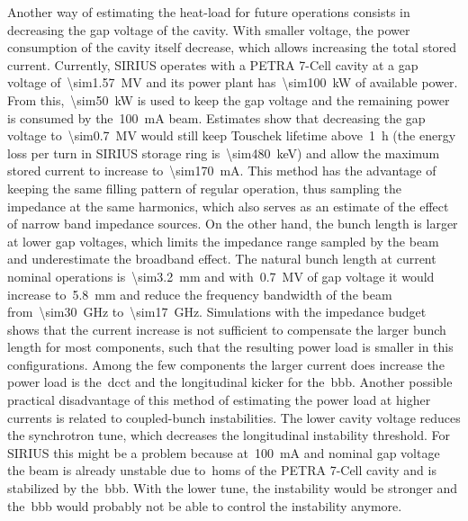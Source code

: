 \documentclass[a4paper,
               biblatex,     %
               ]{jacow}
\begin{document}
    Another way of estimating the heat-load for future operations consists in decreasing the gap voltage of the cavity. With smaller voltage, the power consumption of the cavity itself decrease, which allows increasing the total stored current. Currently, SIRIUS operates with a PETRA 7-Cell cavity at a gap voltage of~\SI{\sim1.57}{\mega\volt} and its power plant has~\SI{\sim100}{\kilo\watt} of available power. From this,~\SI{\sim50}{\kilo\watt} is used to keep the gap voltage and the remaining power is consumed by the~\SI{100}{\milli\ampere} beam. Estimates show that decreasing the gap voltage to~\SI{\sim0.7}{\mega\volt} would still keep Touschek lifetime above~\SI{1}{\hour} (the energy loss per turn in SIRIUS storage ring is~\SI{\sim480}{\kilo\electronvolt}) and allow the maximum stored current to increase to~\SI{\sim170}{\milli\ampere}. This method has the advantage of keeping the same filling pattern of regular operation, thus sampling the impedance at the same harmonics, which also serves as an estimate of the effect of narrow band impedance sources. On the other hand, the bunch length is larger at lower gap voltages, which limits the impedance range sampled by the beam and underestimate the broadband effect. The natural bunch length at current nominal operations is~\SI{\sim3.2}{\milli\meter} and with~\SI{0.7}{\mega\volt} of gap voltage it would increase to~\SI{5.8}{\milli\meter} and reduce the frequency bandwidth of the beam from~\SI{\sim30}{\giga\hertz} to~\SI{\sim17}{\giga\hertz}. Simulations with the impedance budget shows that the current increase is not sufficient to compensate the larger bunch length for most components, such that the resulting power load is smaller in this configurations. Among the few components the larger current does increase the power load is the~\gls{dcct} and the longitudinal kicker for the~\gls{bbb}. Another possible practical disadvantage of this method of estimating the power load at higher currents is related to coupled-bunch instabilities. The lower cavity voltage reduces the synchrotron tune, which decreases the longitudinal instability threshold. For SIRIUS this might be a problem because at~\SI{100}{\milli\ampere} and nominal gap voltage the beam is already unstable due to~\glspl{hom} of the PETRA 7-Cell cavity and is stabilized by the~\gls{bbb}. With the lower tune, the instability would be stronger and the~\gls{bbb} would probably not be able to control the instability anymore.
\end{document}
